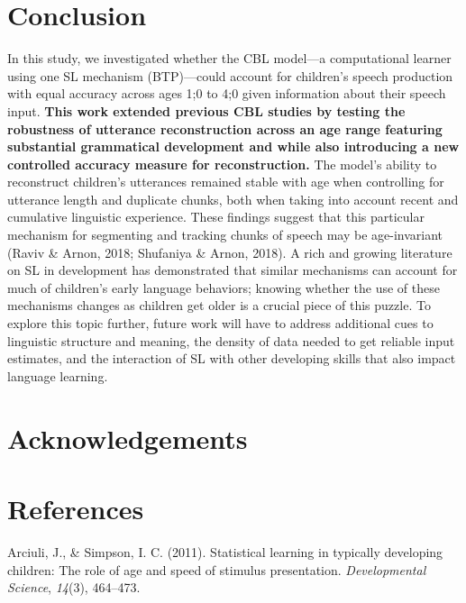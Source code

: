 \documentclass[man,mask,floatsintext]{apa6}
\begin{document}
\section{Conclusion}\label{conclusion}

In this study, we investigated whether the CBL model---a computational
learner using one SL mechanism (BTP)---could account for children's
speech production with equal accuracy across ages 1;0 to 4;0 given
information about their speech input. \textbf{This work extended
previous CBL studies by testing the robustness of utterance
reconstruction across an age range featuring substantial grammatical
development and while also introducing a new controlled accuracy measure
for reconstruction.} The model's ability to reconstruct children's
utterances remained stable with age when controlling for utterance
length and duplicate chunks, both when taking into account recent and
cumulative linguistic experience. These findings suggest that this
particular mechanism for segmenting and tracking chunks of speech may be
age-invariant (Raviv \& Arnon, 2018; Shufaniya \& Arnon, 2018). A rich
and growing literature on SL in development has demonstrated that
similar mechanisms can account for much of children's early language
behaviors; knowing whether the use of these mechanisms changes as
children get older is a crucial piece of this puzzle. To explore this
topic further, future work will have to address additional cues to
linguistic structure and meaning, the density of data needed to get
reliable input estimates, and the interaction of SL with other
developing skills that also impact language learning.

\section{Acknowledgements}\label{acknowledgements}

\newpage

\section{References}\label{references}

\begingroup
\setlength{\parindent}{-0.5in} \setlength{\leftskip}{0.5in}

\hypertarget{refs}{}
\hypertarget{ref-arciuli2011statistical}{}
Arciuli, J., \& Simpson, I. C. (2011). Statistical learning in typically
developing children: The role of age and speed of stimulus presentation.
\emph{Developmental Science}, \emph{14}(3), 464--473.
\end{document}
